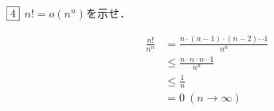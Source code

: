 \documentclass[dvipdfmx]{jsreport}
\begin{document}
\begin{tcolorbox}
	$\fbox{4}$ $n!= o(n^n)$を示せ．
\end{tcolorbox}

\begin{souanswer} %
\begin{align*}
	\frac{n!}{n^n}
	&= \frac{n\cdot (n- 1)\cdot (n- 2)\cdots 1}{n^n}\\
	&\le \frac{n\cdot n\cdot n\cdots 1}{n^n}\\
	&\le \frac{1}{n}\\
	&= 0\ (n\to \infty)
\end{align*}
\end{souanswer}
\end{document}
